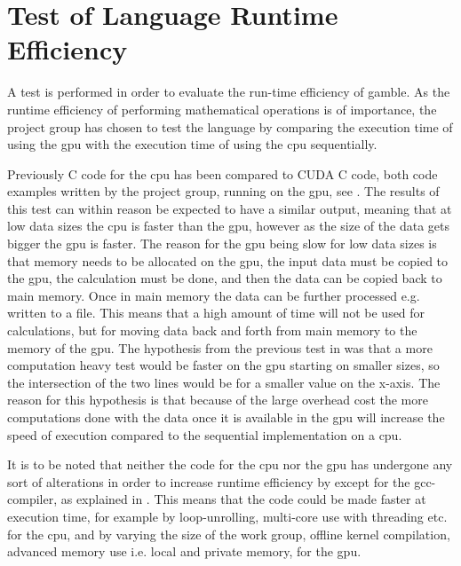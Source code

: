 \section{Test of Language Runtime Efficiency} %
\label{cha:test_of_language}
A test is performed in order to evaluate the run-time efficiency of \gls{gamble}.
As the runtime efficiency of performing mathematical operations is of importance, the project group has chosen to test the language by comparing the execution time of using the \acrshort{gpu} with the execution time of using the \acrshort{cpu} sequentially.

Previously C code for the \acrshort{cpu} has been compared to CUDA C code, both code examples written by the project group, running on the \acrshort{gpu}, see .
The results of this test can within reason be expected to have a similar output, meaning that at low data sizes the \acrshort{cpu} is faster than the \acrshort{gpu}, however as the size of the data gets bigger the \acrshort{gpu} is faster.
The reason for the \acrshort{gpu} being slow for low data sizes is that memory needs to be allocated on the \acrshort{gpu}, the input data must be copied to the \acrshort{gpu}, the calculation must be done, and then the data can be copied back to main memory.
Once in main memory the data can be further processed e.g. written to a file.
This means that a high amount of time will not be used for calculations, but for moving data back and forth from main memory to the memory of the \acrshort{gpu}.
The hypothesis from the previous test in  was that a more computation heavy test would be faster on the \acrshort{gpu} starting on smaller sizes, so the intersection of the two lines would be for a smaller value on the x-axis.
The reason for this hypothesis is that because of the large overhead cost the more computations done with the data once it is available in the \acrshort{gpu} will increase the speed of execution compared to the sequential implementation on a \acrshort{cpu}.

It is to be noted that neither the code for the \acrshort{cpu} nor the \acrshort{gpu} has undergone any sort of alterations in order to increase runtime efficiency by except for the gcc-compiler, as explained in .
This means that the code could be made faster at execution time, for example by loop-unrolling, multi-core use with threading etc. for the \acrshort{cpu}, and by varying the size of the work group, offline kernel compilation, advanced memory use i.e. local and private memory, for the \acrshort{gpu}.

